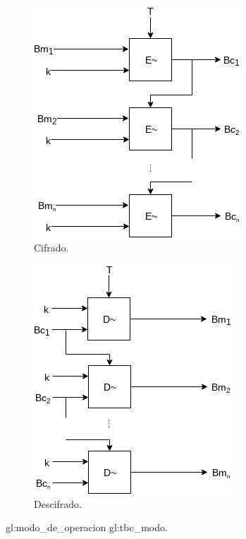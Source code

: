 \begin{figure}[H]
  \centering
  \begin{subfigure}{0.45\textwidth}
    \begin{center}
      \includegraphics[width=0.7\linewidth]{diagramas/tbc.png}
      \caption{Cifrado.}
    \end{center}
  \end{subfigure}
  \begin{subfigure}{0.45\textwidth}
    \begin{center}
      \includegraphics[width=0.7\linewidth]{diagramas/tbc_inverso.png}
      \caption{Descifrado.}
    \end{center}
  \end{subfigure}
  \caption{\Gls{gl:modo_de_operacion} \gls{gl:tbc_modo}.}
  \label{figura:tbc}
\end{figure}

